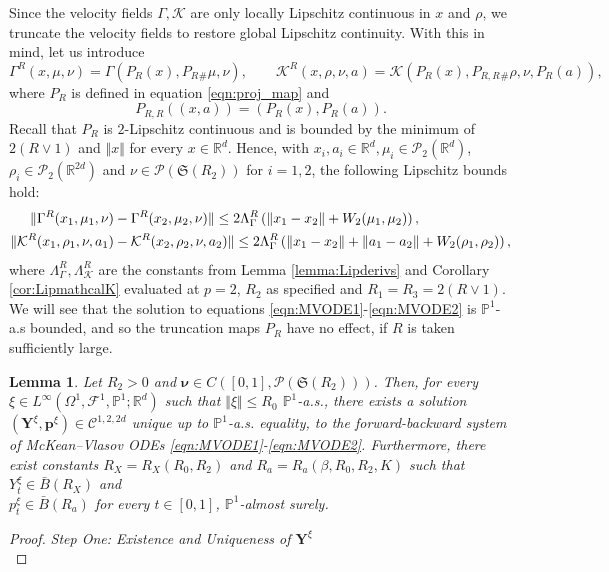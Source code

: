 \documentclass{article}
\newtheorem{lemma}[theorem]{Lemma}
\newcommand{\R}{\mathbb{R}}
\begin{document}
\begin{appendices}
Since the velocity fields $\Gamma,\mathcal K$ are only locally Lipschitz continuous in $x$ and $\rho$, we truncate the velocity fields to restore global Lipschitz continuity. With this in mind, let us introduce
\[
\Gamma^R(x,\mu,\nu) = \Gamma(P_R(x), P_R{}_\#\mu,\nu), \qquad \mathcal K^R(x,\rho,\nu,a) = \mathcal K(P_R(x), P_{R,R}{}_\#\rho,\nu,P_R(a)),
\]
where $P_R$ is defined in equation \eqref{eqn:proj_map} and
\[
P_{R,R}((x,a))= (P_R(x),P_R(a)).
\]
Recall that $P_R$ is $2$-Lipschitz continuous and is bounded by the minimum of $2(R\vee 1)$ and $\Vert x\Vert$ for every $x\in\R^d$. Hence, with $x_i,a_i\in \R^d, \mu_i\in \mathcal P_2(\R^d)$, $\rho_i\in \mathcal P_2(\R^{2d})$ and $\nu \in\mathcal P(\mathfrak{S}(R_2))$ for $i=1,2$, the following Lipschitz bounds hold:
\begin{align}
    \Vert \Gamma^R(x_1,\mu_1,\nu)&-\Gamma^R(x_2,\mu_2,\nu)\Vert \le 2\Lambda^R_\Gamma \left(\Vert x_1-x_2\Vert + W_2(\mu_1,\mu_2) \right),\notag \\
    \Vert \mathcal K^R(x_1,\rho_1,\nu,a_1)&-\mathcal K^R(x_2,\rho_2,\nu,a_2)\Vert \le 2\Lambda^R_\Gamma \left(\Vert x_1-x_2\Vert+\Vert a_1-a_2\Vert + W_2(\rho_1,\rho_2) \right),\notag
\end{align}
where $\Lambda^R_\Gamma,\Lambda^R_{\mathcal K}$ are the constants from Lemma \ref{lemma:Lipderivs} and Corollary \ref{cor:LipmathcalK} evaluated at $p=2$, $R_2$ as specified and $R_1=R_3=2(R\vee1)$. We will see that the solution to equations \eqref{eqn:MVODE1}-\eqref{eqn:MVODE2} is $\mathbb P^1$-a.s  bounded, and so the truncation maps $P_R$ have no effect, if $R$ is taken sufficiently large. 
\begin{lemma}\label{lemma:MVODE_WellDEfined}
    Let $R_2>0$ and $\bm\nu\in C([0,1],\mathcal P(\mathfrak{S}(R_2)))$. Then, for every $\xi \in L^\infty(\Omega^1,\mathcal F^1,\mathbb P^1;\R^d)$ such that $\Vert \xi \Vert \le R_0$ $\mathbb P^1$-a.s., there exists a solution $(\bm Y^\xi,\bm p^\xi) \in\mathscr{C}^{1,2,2d}$ unique up to $\mathbb P^1$-a.s. equality, to the forward-backward system of McKean--Vlasov ODEs \eqref{eqn:MVODE1}-\eqref{eqn:MVODE2}. Furthermore, there exist constants $R_X=R_X(R_0,R_2)$ and $R_a=R_a(\beta,R_0,R_2,K)$ such that $Y^{\xi}_t\in \bar B(R_X)$ and \\$p^\xi_t\in \bar B(R_a)$  for every $t\in[0,1]$, $\mathbb P^1$-almost surely.
\end{lemma}
\begin{proof}
\textit{Step One: Existence and Uniqueness of $\bm{Y}^{\xi}$}\\

\end{proof}
\end{appendices}
\end{document}
